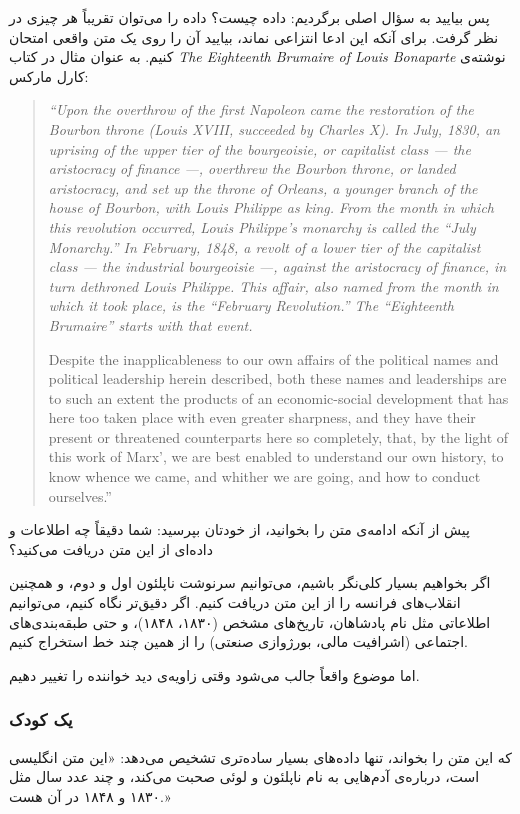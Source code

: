 پس بیایید به سؤال اصلی برگردیم: داده چیست؟ داده را می‌توان تقریباً هر چیزی در نظر گرفت. برای آنکه این ادعا انتزاعی نماند، بیایید آن را روی یک متن واقعی امتحان کنیم. به عنوان مثال در کتاب \textit{The Eighteenth Brumaire of Louis Bonaparte} نوشته‌ی کارل مارکس:

\begin{quote}
\itshape
``Upon the overthrow of the first Napoleon came the restoration of the Bourbon throne (Louis XVIII, succeeded by Charles X). In July, 1830, an uprising of the upper tier of the bourgeoisie, or capitalist class --- the aristocracy of finance ---, overthrew the Bourbon throne, or landed aristocracy, and set up the throne of Orleans, a younger branch of the house of Bourbon, with Louis Philippe as king. From the month in which this revolution occurred, Louis Philippe's monarchy is called the ``July Monarchy.'' In February, 1848, a revolt of a lower tier of the capitalist class --- the industrial bourgeoisie ---, against the aristocracy of finance, in turn dethroned Louis Philippe. This affair, also named from the month in which it took place, is the ``February Revolution.'' The ``Eighteenth Brumaire'' starts with that event.

Despite the inapplicableness to our own affairs of the political names and political leadership herein described, both these names and leaderships are to such an extent the products of an economic-social development that has here too taken place with even greater sharpness, and they have their present or threatened counterparts here so completely, that, by the light of this work of Marx', we are best enabled to understand our own history, to know whence we came, and whither we are going, and how to conduct ourselves.''
\end{quote}

پیش از آنکه ادامه‌ی متن را بخوانید، از خودتان بپرسید: شما دقیقاً چه اطلاعات و داده‌ای از این متن دریافت می‌کنید؟

اگر بخواهیم بسیار کلی‌نگر باشیم، می‌توانیم سرنوشت ناپلئون اول و دوم، و همچنین انقلاب‌های فرانسه را از این متن دریافت کنیم. اگر دقیق‌تر نگاه کنیم، می‌توانیم اطلاعاتی مثل نام پادشاهان، تاریخ‌های مشخص (۱۸۳۰، ۱۸۴۸)، و حتی طبقه‌بندی‌های اجتماعی (اشرافیت مالی، بورژوازی صنعتی) را از همین چند خط استخراج کنیم.

اما موضوع واقعاً جالب می‌شود وقتی زاویه‌ی دید خواننده را تغییر دهیم.

\subsubsection{یک کودک}
که این متن را بخواند، تنها داده‌های بسیار ساده‌تری تشخیص می‌دهد: «این متن انگلیسی است، درباره‌ی آدم‌هایی به نام ناپلئون و لوئی صحبت می‌کند، و چند عدد سال مثل ۱۸۳۰ و ۱۸۴۸ در آن هست.»

